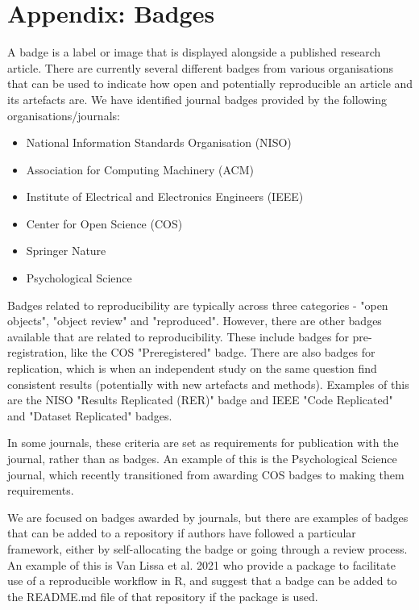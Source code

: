 \section{Appendix: Badges} \label{appendix:badges}

A badge is a label or image that is displayed alongside a published research article. There are currently several different badges from various organisations that can be used to indicate how open and potentially reproducible an article and its artefacts are. We have identified journal badges provided by the following organisations/journals:
\begin{itemize}
    \item National Information Standards Organisation (NISO)
    \item Association for Computing Machinery (ACM)
    \item Institute of Electrical and Electronics Engineers (IEEE)
    \item Center for Open Science (COS)
    \item Springer Nature
    \item Psychological Science
\end{itemize}

Badges related to reproducibility are typically across three categories - "open objects", "object review" and "reproduced". However, there are other badges available that are related to reproducibility. These include badges for pre-registration, like the COS "Preregistered" badge.\autocite{blohowiak_badges_2023} There are also badges for replication, which is when an independent study on the same question find consistent results (potentially with new artefacts and methods). Examples of this are the NISO "Results Replicated (RER)" badge\autocite{niso_reproducibility_badging_and_definitions_working_group_reproducibility_2021} and IEEE "Code Replicated" and "Dataset Replicated" badges.\autocite{institute_of_electrical_and_electronics_engineers_ieee_about_nodate}

In some journals, these criteria are set as requirements for publication with the journal, rather than as badges. An example of this is the Psychological Science journal, which recently transitioned from awarding COS badges to making them requirements.\autocite{hardwicke_transparency_2023}

We are focused on badges awarded by journals, but there are examples of badges that can be added to a repository if authors have followed a particular framework, either by self-allocating the badge or going through a review process. An example of this is Van Lissa et al. 2021\autocite{van_lissa_worcs_2021} who provide a package to facilitate use of a reproducible workflow in R, and suggest that a badge can be added to the README.md file of that repository if the package is used.\autocite{van_lissa_worcs_2021}

